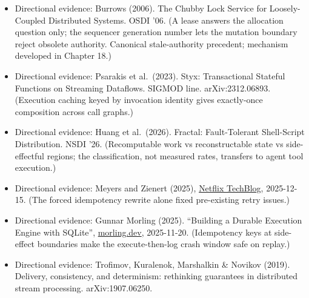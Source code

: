 \begin{itemize}
\tightlist
\item
  Directional evidence: Burrows (2006). The Chubby Lock Service for Loosely-Coupled Distributed Systems. OSDI '06. (A lease answers the allocation question only; the sequencer generation number lets the mutation boundary reject obsolete authority. Canonical stale-authority precedent; mechanism developed in Chapter 18.)
\item
  Directional evidence: Psarakis et al.~(2023). Styx: Transactional Stateful Functions on Streaming Dataflows. SIGMOD line. arXiv:2312.06893. (Execution caching keyed by invocation identity gives exactly-once composition across call graphs.)
\item
  Directional evidence: Huang et al.~(2026). Fractal: Fault-Tolerant Shell-Script Distribution. NSDI '26. (Recomputable work vs reconstructable state vs side-effectful regions; the classification, not measured rates, transfers to agent tool execution.)
\item
  Directional evidence: Meyers and Zienert (2025), \href{https://netflixtechblog.com/how-temporal-powers-reliable-cloud-operations-at-netflix-73c69ccb5953}{Netflix TechBlog}, 2025-12-15. (The forced idempotency rewrite alone fixed pre-existing retry issues.)
\item
  Directional evidence: Gunnar Morling (2025). ``Building a Durable Execution Engine with SQLite'', \href{https://www.morling.dev/blog/building-durable-execution-engine-with-sqlite/}{morling.dev}, 2025-11-20. (Idempotency keys at side-effect boundaries make the execute-then-log crash window safe on replay.)
\item
  Directional evidence: Trofimov, Kuralenok, Marshalkin \& Novikov (2019). Delivery, consistency, and determinism: rethinking guarantees in distributed stream processing. arXiv:1907.06250.
\end{itemize}
